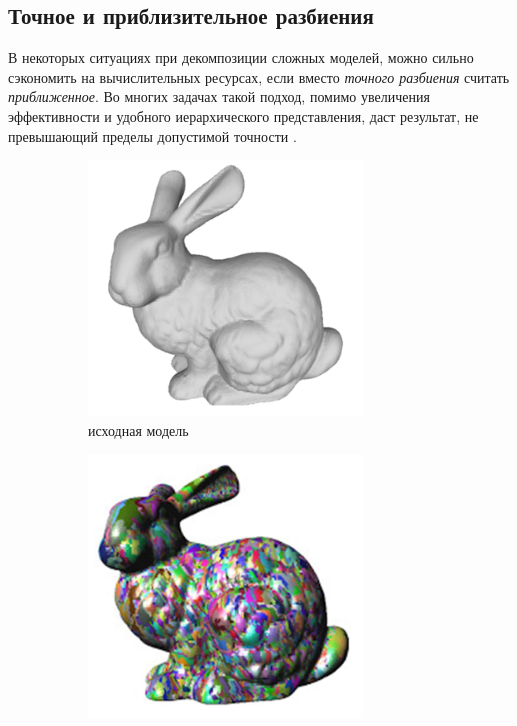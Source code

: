 \documentclass[11pt,a4paper]{extarticle}
\begin{document}
		\subsection{Точное и приблизительное разбиения}
			В некоторых ситуациях при декомпозиции сложных моделей, можно сильно сэкономить на вычислительных ресурсах, если вместо \emph{точного разбиения} считать \emph{приближенное}. 
			Во многих задачах такой подход, помимо увеличения эффективности и удобного иерархического представления, даст результат, не превышающий пределы допустимой точности \cite{JMLien06}.\\
			\begin{figure}[ht]
				\centering
				\begin{subfigure}{2in}
					\includegraphics[width=0.8\textwidth]{acd1}					
					\caption*{исходная модель}
				\end{subfigure}
				\begin{subfigure}{2in}
					\includegraphics[width=0.8\textwidth]{acd2}					

\end{subfigure}
\end{figure}
\end{document}
